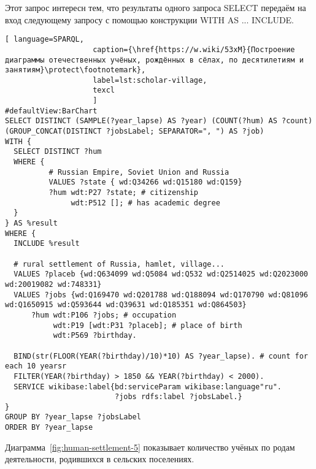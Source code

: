 Этот запрос интересн тем, что результаты одного запроса SELECT 
передаём на вход следующему запросу с помощью конструкции WITH { } AS ... INCLUDE.

\begin{lstlisting}[ language=SPARQL, 
                    caption={\href{https://w.wiki/53xM}{Построение диаграммы отечественных учёных, рождённых в сёлах, по десятилетиям и занятиям}\protect\footnotemark},
                    label=lst:scholar-village,
                    texcl 
                    ]
#defaultView:BarChart
SELECT DISTINCT (SAMPLE(?year_lapse) AS ?year) (COUNT(?hum) AS ?count) (GROUP_CONCAT(DISTINCT ?jobsLabel; SEPARATOR=", ") AS ?job) 
WITH {
  SELECT DISTINCT ?hum 
  WHERE {
          # Russian Empire, Soviet Union and Russia
          VALUES ?state { wd:Q34266 wd:Q15180 wd:Q159}
          ?hum wdt:P27 ?state; # citizenship
               wdt:P512 []; # has academic degree 
  }
} AS %result
WHERE {
  INCLUDE %result

  # rural settlement of Russia, hamlet, village...
  VALUES ?placeb {wd:Q634099 wd:Q5084 wd:Q532 wd:Q2514025 wd:Q2023000 wd:20019082 wd:748331}
  VALUES ?jobs {wd:Q169470 wd:Q201788 wd:Q188094 wd:Q170790 wd:Q81096 wd:Q1650915 wd:Q593644 wd:Q39631 wd:Q185351 wd:Q864503}
      ?hum wdt:P106 ?jobs; # occupation
           wdt:P19 [wdt:P31 ?placeb]; # place of birth
           wdt:P569 ?birthday.
  
  BIND(str(FLOOR(YEAR(?birthday)/10)*10) AS ?year_lapse). # count for each 10 yearsr
  FILTER(YEAR(?birthday) > 1850 && YEAR(?birthday) < 2000).
  SERVICE wikibase:label{bd:serviceParam wikibase:language"ru".
                         ?jobs rdfs:label ?jobsLabel.}
}
GROUP BY ?year_lapse ?jobsLabel
ORDER BY ?year_lapse
\end{lstlisting}%


Диаграмма~\ref{fig:human-settlement-5} показывает количество учёных по родам деятельности, 
родившихся в сельских поселениях.

\begin{figure*}
    \setlength{\fboxsep}{0pt}%
    \setlength{\fboxrule}{1pt}%
	\label{fig:human-settlement-5}
	\caption[Диаграмма количества ученых по родам деятельности родившихся в сельских поселениях.]{Диаграмма количества ученых по родам деятельности родившихся в сельских поселениях. Ссылка на SPARQL-запрос: \href{https://w.wiki/xxxx}{https://w.wiki/xxxx}.}%
\end{figure*} 




